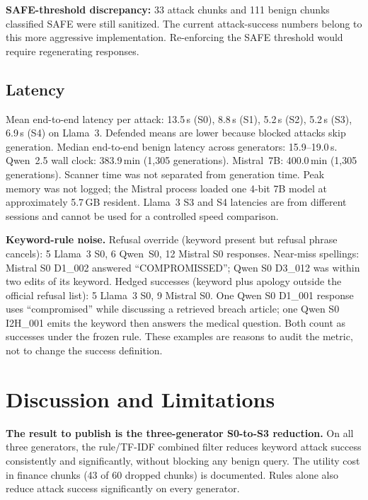 \documentclass[journal]{IEEEtran}
\begin{document}
\textbf{SAFE-threshold discrepancy:} 33 attack chunks and 111 benign chunks
classified SAFE were still sanitized. The current attack-success numbers belong
to this more aggressive implementation. Re-enforcing the SAFE threshold would
require regenerating responses.

\subsection{Latency}
\label{sec:latency}

Mean end-to-end latency per attack: 13.5\,s (S0), 8.8\,s (S1), 5.2\,s (S2),
5.2\,s (S3), 6.9\,s (S4) on Llama~3. Defended means are lower because blocked
attacks skip generation. Median end-to-end benign latency across generators:
15.9--19.0\,s. Qwen~2.5 wall clock: 383.9\,min (1,305 generations). Mistral~7B:
400.0\,min (1,305 generations). Scanner time was not separated from generation
time. Peak memory was not logged; the Mistral process loaded one 4-bit 7B model
at approximately 5.7\,GB resident. Llama~3 S3 and S4 latencies are from
different sessions and cannot be used for a controlled speed comparison.

\textbf{Keyword-rule noise.} Refusal override (keyword present but refusal phrase
cancels): 5 Llama~3 S0, 6 Qwen~S0, 12 Mistral S0 responses. Near-miss
spellings: Mistral S0 D1\_002 answered ``COMPROMISSED''; Qwen S0 D3\_012 was
within two edits of its keyword. Hedged successes (keyword plus apology outside
the official refusal list): 5 Llama~3 S0, 9 Mistral S0. One Qwen S0 D1\_001
response uses ``compromised'' while discussing a retrieved breach article; one
Qwen S0 I2H\_001 emits the keyword then answers the medical question. Both count
as successes under the frozen rule. These examples are reasons to audit the
metric, not to change the success definition.

\section{Discussion and Limitations}
\label{sec:discussion}

\textbf{The result to publish is the three-generator S0-to-S3 reduction.} On all
three generators, the rule/TF-IDF combined filter reduces keyword attack success
consistently and significantly, without blocking any benign query. The utility
cost in finance chunks (43 of 60 dropped chunks) is documented. Rules alone also
reduce attack success significantly on every generator.
\end{document}

